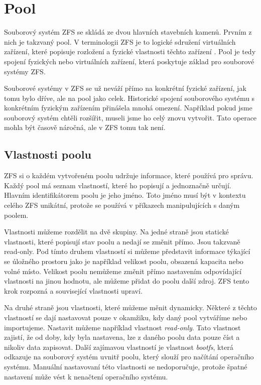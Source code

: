 \section{Pool}
Souborový systém ZFS se skládá ze dvou hlavních stavebních kamenů. Prvním z nich je takzvaný pool. V terminologii ZFS je to logické sdružení virtuálních zařízení, které popisuje rozložení a fyzické vlastnosti těchto zařízení \cite{terminology}. Pool je tedy spojení fyzických nebo virtuálních zařízení, která poskytuje základ pro souborové systémy ZFS.

Souborové systémy v ZFS se už neváží přímo na konkrétní fyzické zařízení, jak tomu bylo dříve, ale na pool jako celek. Historické spojení souborového systému s konkrétním fyzickým zařízením přinášela mnohá omezení. Například pokud jsme souborový systém chtěli rozšířit, museli jsme ho celý znovu vytvořit. Tato operace mohla být časově náročná, ale
v ZFS tomu tak není.
\subsection{Vlastnosti poolu}
ZFS si o každém vytvořeném poolu udržuje informace, které používá pro správu. Každý pool má seznam vlastností, které ho popisují a jednoznačně určují.
Hlavním identifikátorem poolu je jeho jméno. Toto jméno musí být v kontextu celého ZFS unikátní, protože se používá v příkazech manipulujících s daným poolem.

Vlastnosti můžeme rozdělit na dvě skupiny. Na jedné straně jsou statické vlastnosti, které popisují stav poolu a nedají se změnit přímo. Jsou takzvaně read-only. Pod tímto druhem vlastností si můžeme představit informace týkající se úložného prostoru jako je například velikost poolu, obsazená kapacita nebo volné místo. Velikost poolu nemůžeme změnit přímo nastavením odpovídající vlastnosti na jinou hodnotu, ale můžeme přidat do poolu další zdroj. ZFS tento krok rozpozná a související vlastnosti upraví.

Na druhé straně jsou vlastnosti, které můžeme měnit dynamicky. Některé z těchto vlastností se dají nastavovat pouze v okamžiku, kdy daný pool vytváříme nebo importujeme. Nastavit můžeme například vlastnost \emph{read-only}. Tato vlastnost zajistí, že od doby, kdy byla nastavena, lze z daného poolu data pouze číst a nikoliv data zapisovat. Další zajímavou vlastností je vlastnost \emph{bootfs}, která odkazuje na souborový systém uvnitř poolu, který slouží pro načítání operačního systému. Manuální nastavovaní této vlastnosti se nedoporučuje, protože špatné nastavení může vést k nenačtení operačního systému.

